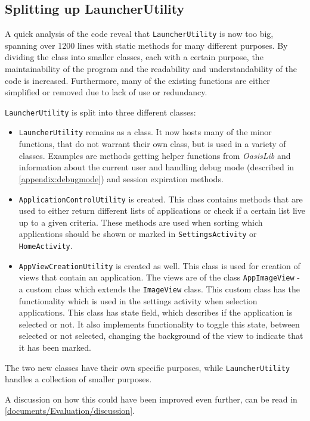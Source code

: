 \subsection{Splitting up LauncherUtility}\label{sect:sprint4:refactoring}

A quick analysis of the code reveal that \lstinline|LauncherUtility| is now too big, spanning over 1200 lines with static methods for many different purposes.
By dividing the class into smaller classes, each with a certain purpose, the maintainability of the program and the readability and understandability of the code is increased.
Furthermore, many of the existing functions are either simplified or removed due to lack of use or redundancy.

\lstinline|LauncherUtility| is split into three different classes:

\begin{itemize}
\item \lstinline|LauncherUtility| remains as a class.
It now hosts many of the minor functions, that do not warrant their own class, but is used in a variety of classes.
Examples are methods getting helper functions from \textit{OasisLib} and  information about the current user and handling debug mode (described in \cref{appendix:debugmode}) and session expiration methods.
\item \lstinline|ApplicationControlUtility| is created.
This class contains methods that are used to either return different lists of applications or check if a certain list live up to a given criteria.
These methods are used when sorting which applications should be shown or marked in \lstinline|SettingsActivity| or \lstinline|HomeActivity|.
\item \lstinline|AppViewCreationUtility| is created as well.
This class is used for creation of views that contain an application.
The views are of the class \lstinline|AppImageView| - a custom class which extends the \lstinline|ImageView| class. This custom class has the functionality which is used in the settings activity when selection applications. This class has state field, which describes if the application is selected or not. It also implements functionality to toggle this state, between selected or not selected, changing the background of the view to indicate that it has been marked.
\end{itemize}

The two new classes have their own specific purposes, while \lstinline|LauncherUtility| handles a collection of smaller purposes.

A discussion on how this could have been improved even further, can be read in \cref{documents/Evaluation/discussion}.
